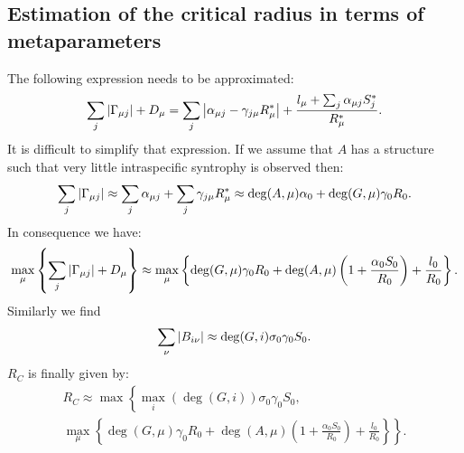 \documentclass[12pt, titlepage, twoside, openright]{report}
\begin{document}
\subsection{Estimation of the critical radius in terms of metaparameters}\label{sec : estimate critical radius parameters}
The following expression needs to be approximated:
\begin{equation}
\sum_j \left|{\Gamma_{\mu j}}\right|+D_\mu = \sum_j \left|{\alpha_{\mu j}-\gamma_{j\mu}R^*_\mu}\right|+\frac{l_\mu+\sum_j\alpha_{\mu j} S^*_j}{R^*_\mu}.
\end{equation}
It is difficult to simplify that expression. If we assume that $A$ has a structure such that very little intraspecific syntrophy is observed then:
\begin{equation}
\sum_j \left|{\Gamma_{\mu j}}\right| \approx \sum_j \alpha_{\mu j}+ \sum_j \gamma_{j\mu}R^*_\mu \approx \deg(A,\mu)\alpha_0+\deg(G,\mu)\gamma_0 R_0.
\end{equation}
In consequence we have:
\begin{equation}
\max_\mu\left\{\sum_j \left|{\Gamma_{\mu j}}\right|+D_\mu\right\} \approx \max_\mu\left\{\deg(G,\mu) \gamma_0 R_0 + \deg(A,\mu)\left(1+\frac{\alpha_0S_0}{R_0}\right)+\frac{l_0}{R_0}\right\}.
\end{equation}
Similarly we find
\begin{equation}
\sum_\nu \left|{B_{i\nu}}\right| \approx \deg(G, i) \sigma_0 \gamma_0 S_0.
\end{equation}
$R_C$ is finally given by:
\begin{multline}
R_C \approx \max\left\{ \max_i\left(\deg(G,i)\right) \sigma_0 \gamma_0 S_0 \right., \\
 \left.\max_\mu\left\{\deg(G,\mu) \gamma_0 R_0 + \deg(A,\mu)\left(1+\frac{\alpha_0S_0}{R_0}\right)+\frac{l_0}{R_0}\right\}\right\}.
\end{multline}
\end{document}
